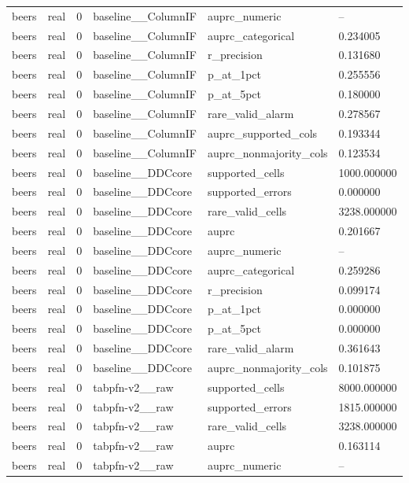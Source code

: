 \begin{tabular}{llllll}
beers & real & 0 & baseline\_\_ColumnIF & auprc\_numeric & -- \\
beers & real & 0 & baseline\_\_ColumnIF & auprc\_categorical & 0.234005 \\
beers & real & 0 & baseline\_\_ColumnIF & r\_precision & 0.131680 \\
beers & real & 0 & baseline\_\_ColumnIF & p\_at\_1pct & 0.255556 \\
beers & real & 0 & baseline\_\_ColumnIF & p\_at\_5pct & 0.180000 \\
beers & real & 0 & baseline\_\_ColumnIF & rare\_valid\_alarm & 0.278567 \\
beers & real & 0 & baseline\_\_ColumnIF & auprc\_supported\_cols & 0.193344 \\
beers & real & 0 & baseline\_\_ColumnIF & auprc\_nonmajority\_cols & 0.123534 \\
beers & real & 0 & baseline\_\_DDCcore & supported\_cells & 1000.000000 \\
beers & real & 0 & baseline\_\_DDCcore & supported\_errors & 0.000000 \\
beers & real & 0 & baseline\_\_DDCcore & rare\_valid\_cells & 3238.000000 \\
beers & real & 0 & baseline\_\_DDCcore & auprc & 0.201667 \\
beers & real & 0 & baseline\_\_DDCcore & auprc\_numeric & -- \\
beers & real & 0 & baseline\_\_DDCcore & auprc\_categorical & 0.259286 \\
beers & real & 0 & baseline\_\_DDCcore & r\_precision & 0.099174 \\
beers & real & 0 & baseline\_\_DDCcore & p\_at\_1pct & 0.000000 \\
beers & real & 0 & baseline\_\_DDCcore & p\_at\_5pct & 0.000000 \\
beers & real & 0 & baseline\_\_DDCcore & rare\_valid\_alarm & 0.361643 \\
beers & real & 0 & baseline\_\_DDCcore & auprc\_nonmajority\_cols & 0.101875 \\
beers & real & 0 & tabpfn-v2\_\_raw & supported\_cells & 8000.000000 \\
beers & real & 0 & tabpfn-v2\_\_raw & supported\_errors & 1815.000000 \\
beers & real & 0 & tabpfn-v2\_\_raw & rare\_valid\_cells & 3238.000000 \\
beers & real & 0 & tabpfn-v2\_\_raw & auprc & 0.163114 \\
beers & real & 0 & tabpfn-v2\_\_raw & auprc\_numeric & -- \\

\end{tabular}
